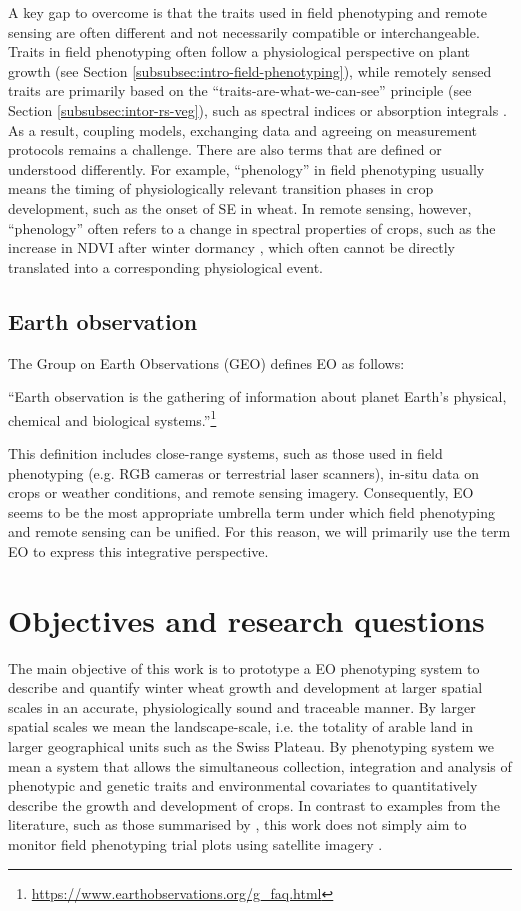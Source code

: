 A key gap to overcome is that the traits used in field phenotyping and remote sensing are often different and not necessarily compatible or interchangeable. Traits in field phenotyping often follow a physiological perspective on plant growth (see Section \ref{subsubsec:intro-field-phenotyping}), while remotely sensed traits are primarily based on the ``traits-are-what-we-can-see'' principle (see Section \ref{subsubsec:intor-rs-veg}), such as spectral indices \cite{bannari_review_1995} or absorption integrals \citep[for example]{wocher_rtm-based_2020}. As a result, coupling models, exchanging data and agreeing on measurement protocols remains a challenge. There are also terms that are defined or understood differently. For example, ``phenology'' in field phenotyping usually means the timing of physiologically relevant transition phases in crop development, such as the onset of \gls{SE} in wheat. In remote sensing, however, ``phenology'' often refers to a change in spectral properties of crops, such as the increase in \gls{NDVI} after winter dormancy \citep{de_beurs_land_2004}, which often cannot be directly translated into a corresponding physiological event.

\subsection{Earth observation}
\label{subsubsec:intro-eo}
The Group on Earth Observations (GEO) defines \gls{EO} as follows:
\begin{displayquote}
``Earth observation is the gathering of information about planet Earth's physical, chemical and biological systems.''\footnote{\url{https://www.earthobservations.org/g_faq.html}}
\end{displayquote}
This definition includes close-range systems, such as those used in field phenotyping (e.g. RGB cameras or terrestrial laser scanners), in-situ data on crops or weather conditions, and remote sensing imagery.
Consequently, \gls{EO} seems to be the most appropriate umbrella term under which field phenotyping and remote sensing can be unified. For this reason, we will primarily use the term \gls{EO} to express this integrative perspective.

\section{Objectives and research questions}
\label{sec:intro-obj-rj}
The main objective of this work is to prototype a \gls{EO} phenotyping system to describe and quantify winter wheat growth and development at larger spatial scales in an accurate, physiologically sound and traceable manner. By larger spatial scales we mean the landscape-scale, i.e. the totality of arable land in larger geographical units such as the Swiss Plateau. By phenotyping system we mean a system that allows the simultaneous collection, integration and analysis of phenotypic and genetic traits and environmental covariates to quantitatively describe the growth and development of crops. In contrast to examples from the literature, such as those summarised by \cite{zhang_high-resolution_2020}, this work does not simply aim to monitor field phenotyping trial plots using satellite imagery \citep{pinto_satellite_2023}.

